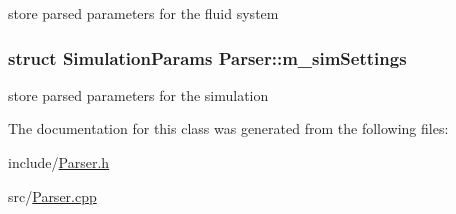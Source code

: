 store parsed parameters for the fluid system \hypertarget{classParser_acf49fee1776c3a865fd38487e7680f6f}{
\subsubsection[{m\_\-simSettings}]{\setlength{\rightskip}{0pt plus 5cm}struct {\bf SimulationParams} {\bf Parser::m\_\-simSettings}}}
\label{classParser_acf49fee1776c3a865fd38487e7680f6f}


store parsed parameters for the simulation 

The documentation for this class was generated from the following files:\begin{DoxyCompactItemize}
\item 
include/\hyperlink{Parser_8h}{Parser.h}\item 
src/\hyperlink{Parser_8cpp}{Parser.cpp}\end{DoxyCompactItemize}
